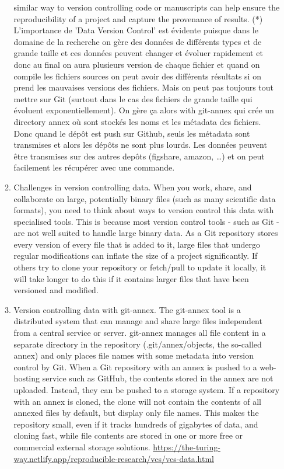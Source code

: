 \documentclass[11pt]{article}
\begin{document}
\begin{enumerate}
\begin{enumerate}
similar way to version controlling code or manuscripts can help
ensure the reproducibility of a project and capture the provenance
of results.
(*) L'importance de 'Data Version Control' est évidente puisque dans
le domaine de la recherche on gère des données de différents types
et de grande taille et ces données peuvent changer et évoluer
rapidement et donc au final on aura plusieurs version de chaque
fichier et quand on compile les fichiers sources on peut avoir des
différents résultats si on prend les mauvaises versions des
fichiers. Mais on peut pas toujours tout mettre sur Git (surtout
dans le cas des fichiers de grande taille qui évoluent
exponentiellement). On gère ça alors with git-annex qui crée un
directory annex où sont stockés les noms et les métadata des
fichiers. Donc quand le dépôt est push sur Github, seuls les
métadata sont transmises et alors les dépôts ne sont plus
lourds. Les données peuvent être transmises sur des autres depôts
(figshare, amazon, \ldots{}) et on peut facilement les récupérer avec
une commande.

\item Challenges in version controlling data.
\label{sec:orgc970780}
When you work, share, and collaborate on large, potentially binary
files (such as many scientific data formats), you need to think
about ways to version control this data with specialised
tools. This is because most version control tools - such as Git -
are not well suited to handle large binary data. As a Git
repository stores every version of every file that is added to it,
large files that undergo regular modifications can inflate the size
of a project significantly. If others try to clone your repository
or fetch/pull to update it locally, it will take longer to do this
if it contains larger files that have been versioned and modified.
\item Version controlling data with git-annex.
\label{sec:org37c6d14}
The git-annex tool is a distributed system that can manage and
share large files independent from a central service or
server. git-annex manages all file content in a separate directory
in the repository (.git/annex/objects, the so-called annex) and
only places file names with some metadata into version control by
Git. When a Git repository with an annex is pushed to a web-hosting
service such as GitHub, the contents stored in the annex are not
uploaded. Instead, they can be pushed to a storage system.
If a repository with an annex is cloned, the clone will not
contain the contents of all annexed files by default, but display
only file names. This makes the repository small, even if it tracks
hundreds of gigabytes of data, and cloning fast, while file
contents are stored in one or more free or commercial external
storage solutions.
\url{https://the-turing-way.netlify.app/reproducible-research/vcs/vcs-data.html}
\end{enumerate}
\end{enumerate}
\end{document}

